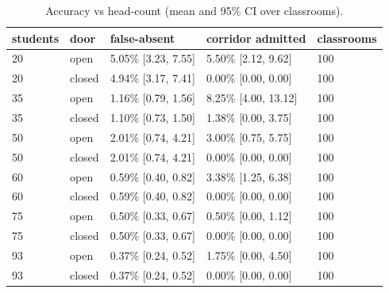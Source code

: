 \begin{table}[t]
\centering
\caption{Accuracy vs head-count (mean and 95\% CI over classrooms).}\label{tab:e01}
\begin{tabular}{lllll}
\toprule
students & door & false-absent & corridor admitted & classrooms \\
\midrule
20 & open & 5.05\% [3.23, 7.55] & 5.50\% [2.12, 9.62] & 100 \\
20 & closed & 4.94\% [3.17, 7.41] & 0.00\% [0.00, 0.00] & 100 \\
35 & open & 1.16\% [0.79, 1.56] & 8.25\% [4.00, 13.12] & 100 \\
35 & closed & 1.10\% [0.73, 1.50] & 1.38\% [0.00, 3.75] & 100 \\
50 & open & 2.01\% [0.74, 4.21] & 3.00\% [0.75, 5.75] & 100 \\
50 & closed & 2.01\% [0.74, 4.21] & 0.00\% [0.00, 0.00] & 100 \\
60 & open & 0.59\% [0.40, 0.82] & 3.38\% [1.25, 6.38] & 100 \\
60 & closed & 0.59\% [0.40, 0.82] & 0.00\% [0.00, 0.00] & 100 \\
75 & open & 0.50\% [0.33, 0.67] & 0.50\% [0.00, 1.12] & 100 \\
75 & closed & 0.50\% [0.33, 0.67] & 0.00\% [0.00, 0.00] & 100 \\
93 & open & 0.37\% [0.24, 0.52] & 1.75\% [0.00, 4.50] & 100 \\
93 & closed & 0.37\% [0.24, 0.52] & 0.00\% [0.00, 0.00] & 100 \\
\bottomrule
\end{tabular}
\end{table}
